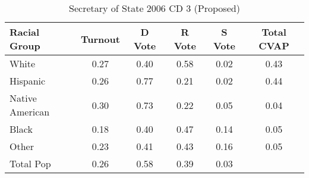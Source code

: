 \begin{table}[htb]
\begin{center}
\caption{Secretary of State 2006 CD 3 (Proposed)}
\label{sos06_cvap_cd_3}
\begin{tabular}{lccccc}
  \hline
Racial Group & Turnout & D Vote & R Vote & S Vote & Total CVAP \\ 
  \hline
White & 0.27 & 0.40 & 0.58 & 0.02 & 0.43 \\ 
  Hispanic & 0.26 & 0.77 & 0.21 & 0.02 & 0.44 \\ 
  Native American & 0.30 & 0.73 & 0.22 & 0.05 & 0.04 \\ 
  Black & 0.18 & 0.40 & 0.47 & 0.14 & 0.05 \\ 
  Other & 0.23 & 0.41 & 0.43 & 0.16 & 0.05 \\ 
  Total Pop & 0.26 & 0.58 & 0.39 & 0.03 &  \\ 
   \hline
\end{tabular}
\end{center}
\end{table}
